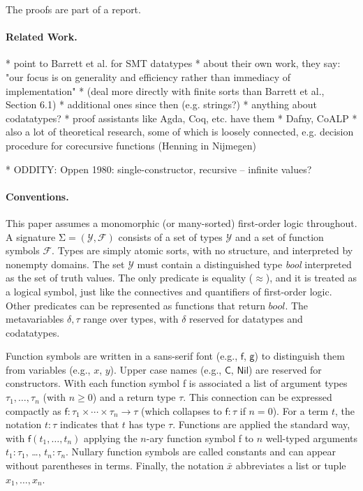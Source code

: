 \documentclass[a4paper,oribibl,envcountsame,draft]{llncs}
\newcommand\Sig{\mathrm{\Sigma}}
\newcommand\const[1]{\textsf{#1}}
\newcommand\ty[1]{\textit{#1}}
\newcommand{\teq}{\approx}
\newcommand\Types{\mathcal{Y}}
\newcommand\Funcs{\mathcal{F}}
\begin{document}
The proofs are part of a report.

\paragraph{Related Work.}

    * point to Barrett et al. for SMT datatypes
      * about their own work, they say: "our focus is on generality and
        efficiency rather than immediacy of implementation"
      * (deal more directly with finite sorts than Barrett et al., Section 6.1)
    * additional ones since then (e.g. strings?)
    * anything about codatatypes?
      * proof assistants like Agda, Coq, etc. have them
      * Dafny, CoALP
      * also a lot of theoretical research, some of which is loosely connected,
        e.g. decision procedure for corecursive functions (Henning in Nijmegen)

    * ODDITY: Oppen 1980: single-constructor, recursive -- infinite values?

\paragraph{Conventions.}
This paper assumes a monomorphic (or many-sorted) first-order logic throughout.
A signature $\Sig = (\Types, \Funcs)$ consists of a set of types $\Types$ and a
set of function symbols $\Funcs$. Types are simply atomic sorts, with no
structure, and interpreted by nonempty domains. The set $\Types$ must contain a
distinguished type \ty{bool} interpreted as the set of truth
values. %
The only predicate is equality ($\teq$), and it is treated as a logical symbol,
just like the connectives and quantifiers of first-order logic.
Other predicates can be represented as functions that return $\ty{bool}$.
The metavariables $\delta, \tau$ range over types, with $\delta$ reserved
for datatypes and codatatypes.

Function symbols are written in a sans-serif font (e.g., $\const{f}$, $\const{g}$) to
distinguish them from variables (e.g., $x$, $y$). Upper case names (e.g., $\const{C}$,
$\const{Nil}$) are reserved for constructors. With each function symbol \const{f}
is associated a list of argument types $\tau_1,\ldots,\tau_n$ (with $n \ge 0$)
and a return type $\tau$. This connection can be expressed compactly as
$\const{f} : \tau_1 \times \cdots \times \tau_n \to \tau$
(which collapses to $\const{f} : \tau$ if $n = 0$).
For a term $t$, the notation $t : \tau$ indicates that $t$ has type $\tau$.
Functions are applied the standard way, with $\const{f}(t_1,\ldots,t_n)$
applying the $n$-ary function symbol
\const{f} to $n$ well-typed arguments $t_1 : \tau_1$, \ldots, $t_n :
\tau_n$. Nullary function symbols are called constants and can appear without
parentheses in terms.
%
Finally, the notation $\bar x$ abbreviates a list or tuple $x_1,\ldots,x_n$.
\end{document}
